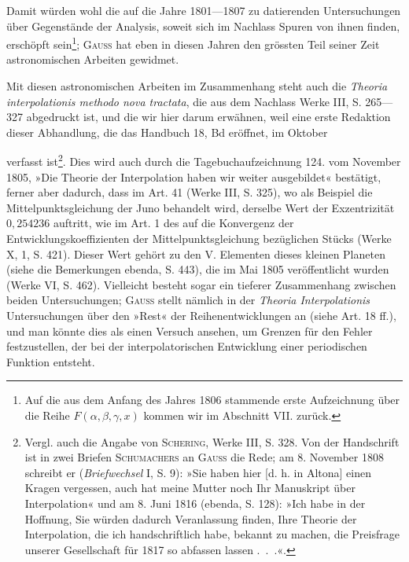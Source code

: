 Damit würden wohl die auf die Jahre 1801—1807 zu datierenden Untersuchungen
über Gegenstände der Analysis, soweit sich im Nachlass Spuren
von ihnen finden, erschöpft sein\footnote{Auf die aus dem Anfang des Jahres 1806 stammende erste Aufzeichnung über die Reihe \(F(\alpha,\beta,\gamma,x)\) kommen wir im Abschnitt VII. zurück.}; \textsc{Gauss} hat eben in diesen Jahren den
grössten Teil seiner Zeit astronomischen Arbeiten gewidmet.

Mit diesen astronomischen Arbeiten im Zusammenhang steht auch die
\textit{Theoria interpolationis methodo nova tractata}, die aus dem Nachlass Werke III,
S. 265—327 abgedruckt ist, und die wir hier darum erwähnen, weil eine erste
Redaktion dieser Abhandlung, die das Handbuch 18, Bd eröffnet, im Oktober\par
\clearpage{}
 verfasst ist\footnote{Vergl. auch die Angabe von \textsc{Schering}, Werke III, S. 328. Von der Handschrift ist in zwei Briefen \textsc{Schumachers} an \textsc{Gauss} die Rede; am 8. November 1808 schreibt er (\textit{Briefwechsel} I, S. 9): »Sie haben hier [d. h. in Altona] einen Kragen vergessen, auch hat meine Mutter noch Ihr Manuskript über Interpolation« und am 8. Juni 1816 (ebenda, S. 128): »Ich habe in der Hoffnung, Sie würden dadurch Veranlassung finden, Ihre Theorie der Interpolation, die ich handschriftlich habe, bekannt zu machen, die Preisfrage unserer Gesellschaft für 1817 so abfassen lassen .\ .\ .«.}. Dies wird auch durch die Tagebuchaufzeichnung 124.
vom November 1805, »Die Theorie der Interpolation haben wir weiter ausgebildet«
bestätigt, ferner aber dadurch, dass im Art. 41 (Werke III, S. 325), wo
als Beispiel die Mittelpunktsgleichung der Juno behandelt wird, derselbe Wert
der Exzentrizität \(0{,}254236\) auftritt, wie im Art. 1 des auf die Konvergenz
der Entwicklungskoeffizienten der Mittelpunktsgleichung bezüglichen Stücks
(Werke X, 1, S. 421). Dieser Wert gehört zu den V. Elementen dieses kleinen
Planeten (siehe die Bemerkungen ebenda, S. 443), die im Mai 1805 veröffentlicht
wurden (Werke VI, S. 462). Vielleicht besteht sogar ein tieferer Zusammenhang
zwischen beiden Untersuchungen; \textsc{Gauss} stellt nämlich in der
\textit{Theoria Interpolationis} Untersuchungen über den »Rest« der Reihenentwicklungen
an (siehe Art. 18 ff.), und man könnte dies als einen Versuch ansehen,
um Grenzen für den Fehler festzustellen, der bei der interpolatorischen Entwicklung
einer periodischen Funktion entsteht.

